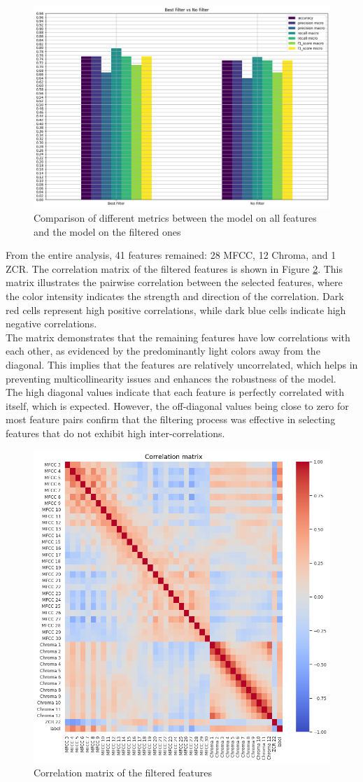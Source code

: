 \begin{figure}[H]
    \centering
    \includegraphics[width=0.8\columnwidth]{../images/model_on_all_features_vs_model_on_best.png}
    \caption{Comparison of different metrics between the model on all features and the model on the filtered ones}
    \label{fig:comparison_model_on_all_features_vs_model_on_best}
\end{figure}
\noindent
From the entire analysis, 41 features remained: 28 MFCC, 12 Chroma, and 1 ZCR.
The correlation matrix of the filtered features is shown in Figure \ref{fig:correlation_matrix}.
This matrix illustrates the pairwise correlation between the selected features, where the color intensity indicates the strength and direction of the correlation.
Dark red cells represent high positive correlations, while dark blue cells indicate high negative correlations.\\
The matrix demonstrates that the remaining features have low correlations with each other, as evidenced by the predominantly light colors away from the diagonal.
This implies that the features are relatively uncorrelated, which helps in preventing multicollinearity issues and enhances the robustness of the model.\\
The high diagonal values indicate that each feature is perfectly correlated with itself, which is expected.
However, the off-diagonal values being close to zero for most feature pairs confirm that the filtering process was effective in selecting
features that do not exhibit high inter-correlations. 

\begin{figure}[H]
    \centering
    \includegraphics[width=0.8\columnwidth]{../images/correlation_matrix.png}
    \caption{Correlation matrix of the filtered features}
    \label{fig:correlation_matrix}
\end{figure}
